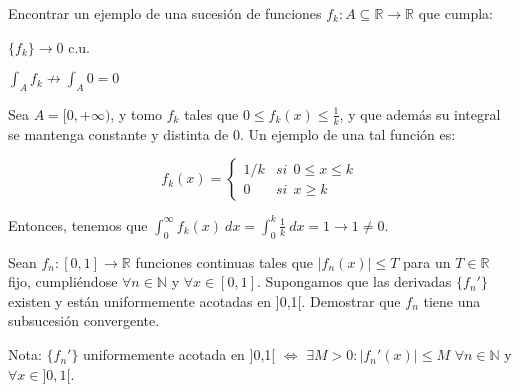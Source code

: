 \begin{ejer}
  Encontrar un ejemplo de una sucesión de funciones $f_k: A \subseteq \mathbb{R} \to \mathbb{R}$ que cumpla:
  \begin{nlist}
  \item $\{f_k\} \to 0$ c.u.
  \item $\displaystyle \int_A f_k \not \to \int_A 0 = 0$
  \end{nlist}
\end{ejer}

\begin{sol}
    Sea $A = [0,+\infty)$, y tomo $f_k$ tales que $0 \le f_k(x) \le \frac{1}{k}$, y que además su integral se mantenga constante y distinta de 0. Un ejemplo de una tal función es:

    $$f_k(x) =
    \begin{cases}
      1/k & si \ \ 0 \le x \le k \\
      0 & si \ \ x \ge k
    \end{cases}$$

    Entonces, tenemos que $\displaystyle \int_0^\infty f_k(x)\ dx = \int_0^k \frac{1}{k}\ dx = 1 \to 1 \ne 0 $.
 \end{sol}

\begin{ejer}
  Sean $f_n:[0,1]\longrightarrow \mathbb{R}$ funciones continuas tales que $|f_n(x)| \leq T$ para un $T \in \mathbb{R}$ fijo, cumpliéndose $\forall n \in \mathbb{N}$ y $\forall x \in [0,1]$. Supongamos que las derivadas $\{f_n'\}$ existen y están uniformemente acotadas en ]0,1[. 	Demostrar que $f_n$ tiene una subsucesión convergente.

 Nota: $\{f_n'\}$ uniformemente acotada en ]0,1[ $\Leftrightarrow$ $\exists M > 0 : |f_n'(x)| \leq M$ $\forall n \in \mathbb{N}$ y $\forall x \in ]0,1[$.

\end{ejer}

